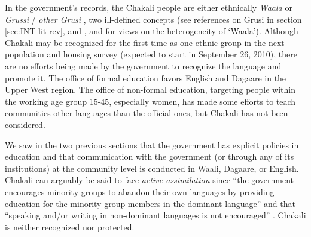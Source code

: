 In the government's records, the Chakali people are either ethnically {\it
Waala} or {\it Grussi} / {\it other Grusi} \citep{GSS00, Ghan08}, two
ill-defined concepts (see references on Grusi in section \ref{sec:INT-lit-rev}, 
and \citet[398]{Ratt32b}, \citet[2]{Mano51} and 
\citet[13-17]{Wilk89} for  views on the heterogeneity of  `Waala').  Although
Chakali may be recognized for the first time as one ethnic group in the next
population and housing survey (expected to start in September 26,
2010), there are no efforts being made by the government to recognize the
language and promote it.  The office of formal education favors 
English and Dagaare in the Upper West region. The office of non-formal
education, targeting people within the working age group 15-45, especially
women,  has
made some efforts to teach communities other languages than the official ones,
but Chakali has not been considered.

We saw in the two previous sections  that the government  has explicit policies
in education and that communication with the government (or through any of its
institutions) at the community level is conducted in
Waali, Dagaare, or English. Chakali can arguably be said to  face {\it
active assimilation} since ``the government encourages minority groups to
abandon their own languages by providing education for the minority group
members in the dominant language'' and that ``speaking and/or writing in
non-dominant languages is not encouraged''  \citep[13]{Reco03}.  Chakali
is neither recognized nor protected. 





% 
% 



